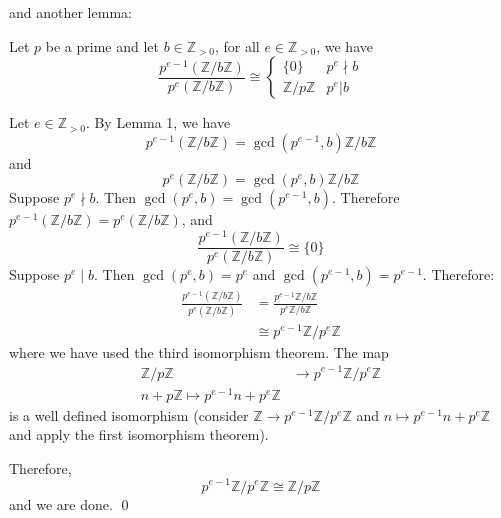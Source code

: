 \documentclass{article}
\renewenvironment{proof}{{\bfseries\color{blue1} Proof:}}{\qed}
\begin{document}
and another lemma:
\begin{idea}
    Let $p$ be a prime and let $b\in \mathbb{Z}_{>0}$, for all $e\in \mathbb{Z}_{>0}$, we have
    \begin{equation*}
        \frac{p^{e-1}(\mathbb{Z}/b\mathbb{Z})}{p^e(\mathbb{Z}/b\mathbb{Z})} \cong \begin{cases}
            \{0\} & p^e \nmid b \\ 
            \mathbb{Z}/p\mathbb{Z} & p^e | b
        \end{cases}
    \end{equation*}
\end{idea}
\begin{proof}
    Let $e\in \mathbb{Z}_{>0}$. By Lemma 1, we have
    \begin{equation*}
        p^{e-1}(\mathbb{Z}/b\mathbb{Z}) = \gcd(p^{e-1},b)\mathbb{Z}/b\mathbb{Z}
    \end{equation*}
    and
    \begin{equation*}
        p^e(\mathbb{Z}/b\mathbb{Z}) = \gcd(p^e,b)\mathbb{Z}/b\mathbb{Z}
    \end{equation*}
    Suppose $p^e \nmid b$. Then $\gcd(p^e,b)=\gcd(p^{e-1},b)$. Therefore $p^{e-1}(\mathbb{Z}/b\mathbb{Z})=p^e(\mathbb{Z}/b\mathbb{Z})$, and
    \begin{equation*}
        \frac{p^{e-1}(\mathbb{Z}/b\mathbb{Z})}{p^e(\mathbb{Z}/b\mathbb{Z})} \cong \{0\}
    \end{equation*}
    Suppose $p^e \mid b$. Then $\gcd(p^e,b)=p^e$ and $\gcd(p^{e-1},b)=p^{e-1}$. Therefore:
    \begin{align*}
        \frac{p^{e-1}(\mathbb{Z}/b\mathbb{Z})}{p^e(\mathbb{Z}/b\mathbb{Z})} &= \frac{p^{e-1}\mathbb{Z}/b\mathbb{Z}}{p^e\mathbb{Z}/b\mathbb{Z}} \\ 
        &\cong p^{e-1}\mathbb{Z}/p^e\mathbb{Z} 
    \end{align*}
    where we have used the third isomorphism theorem. The map 
    \begin{align*}
        \mathbb{Z}/p\mathbb{Z} &\rightarrow p^{e-1}\mathbb{Z}/p^e\mathbb{Z} \\ 
        n+p\mathbb{Z} \mapsto p^{e-1}n+p^e\mathbb{Z}
    \end{align*}
    is a well defined isomorphism (consider $\mathbb{Z} \rightarrow p^{e-1}\mathbb{Z}/p^e\mathbb{Z}$ and $n \mapsto p^{e-1}n+p^e\mathbb{Z}$ and apply the first isomorphism theorem).

    Therefore, 
    \begin{equation*}
        p^{e-1}\mathbb{Z}/p^e\mathbb{Z}  \cong \mathbb{Z}/p\mathbb{Z}
    \end{equation*}
    and we are done.
\end{proof}
\end{document}
